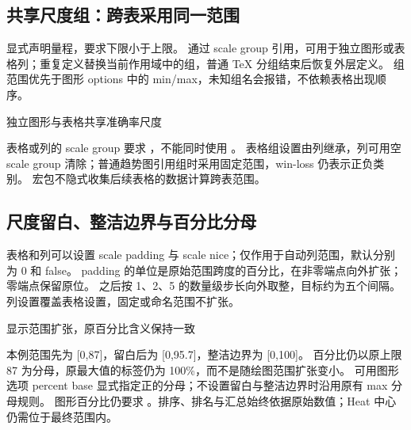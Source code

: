\subsection{共享尺度组：跨表采用同一范围}
 显式声明量程，要求下限小于上限。
通过 scale group 引用，可用于独立图形或表格列；重复定义替换当前作用域中的组，普通 TeX 分组结束后恢复外层定义。
组范围优先于图形 options 中的 min/max，未知组名会报错，不依赖表格出现顺序。
\begin{example}[text and listing,sidebyside=false]{独立图形与表格共享准确率尺度}

\begin{center}
\begin{gradtable}[align=c,header align=c,style=academic,theme=violet,width=\linewidth]
\end{gradtable}
\end{center}
\end{example}
表格或列的 scale group 要求 ，不能同时使用 。
表格组设置由列继承，列可用空 scale group 清除；普通趋势图引用组时采用固定范围，win-loss 仍表示正负类别。
宏包不隐式收集后续表格的数据计算跨表范围。
\subsection{尺度留白、整洁边界与百分比分母}
表格和列可以设置 scale padding 与 scale nice；仅作用于自动列范围，默认分别为 0 和 false。
padding 的单位是原始范围跨度的百分比，在非零端点向外扩张；零端点保留原位。
之后按 1、2、5 的数量级步长向外取整，目标约为五个间隔。列设置覆盖表格设置，固定或命名范围不扩张。
\begin{example}[text and listing,sidebyside=false]{显示范围扩张，原百分比含义保持一致}
\begin{center}
\begin{gradtable}[align=c,header align=c,style=compact,theme=forest,width=\linewidth,
  scale=column,scale padding=10,scale nice=true]
\end{gradtable}
\end{center}
\end{example}
本例范围先为 [0,87]，留白后为 [0,95.7]，整洁边界为 [0,100]。
百分比仍以原上限 87 为分母，原最大值的标签仍为 100\%，而不是随绘图范围扩张变小。
可用图形选项 percent base 显式指定正的分母；不设置留白与整洁边界时沿用原有 max 分母规则。
图形百分比仍要求 。排序、排名与汇总始终依据原始数值；Heat 中心仍需位于最终范围内。
